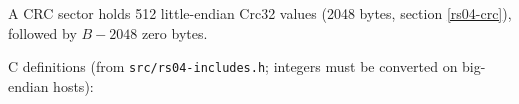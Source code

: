 A CRC sector holds 512 little-endian Crc32 values (2048 bytes, section
\ref{rs04-crc}), followed by $B - 2048$ zero bytes.

\medskip

C definitions (from {\tt src/rs04-includes.h}; integers must be converted on
big-endian hosts):


